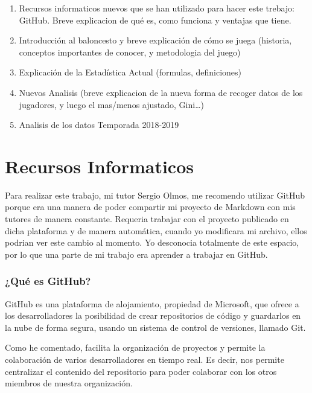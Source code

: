 \documentclass[
]{article}
\begin{document}
\begin{enumerate}
\def\labelenumi{\arabic{enumi}.}
\setcounter{enumi}{-1}
\item
  Recursos informaticos nuevos que se han utilizado para hacer este
  trebajo: GitHub. Breve explicacion de qué es, como funciona y ventajas
  que tiene.
\item
  Introducción al baloncesto y breve explicación de cómo se juega
  (historia, conceptos importantes de conocer, y metodologia del juego)
\item
  Explicación de la Estadística Actual (formulas, definiciones)
\item
  Nuevos Analisis (breve explicacion de la nueva forma de recoger datos
  de los jugadores, y luego el mas/menos ajustado, Gini\ldots)
\item
  Analisis de los datos Temporada 2018-2019
\end{enumerate}

\hypertarget{recursos-informaticos}{%
\section{Recursos Informaticos}\label{recursos-informaticos}}

Para realizar este trabajo, mi tutor Sergio Olmos, me recomendo utilizar
GitHub porque era una manera de poder compartir mi proyecto de Markdown
con mis tutores de manera constante. Requeria trabajar con el proyecto
publicado en dicha plataforma y de manera automática, cuando yo
modificara mi archivo, ellos podrian ver este cambio al momento. Yo
desconocia totalmente de este espacio, por lo que una parte de mi
trabajo era aprender a trabajar en GitHub.

\hypertarget{quuxe9-es-github}{%
\subsubsection{¿Qué es GitHub?}\label{quuxe9-es-github}}

GitHub es una plataforma de alojamiento, propiedad de Microsoft, que
ofrece a los desarrolladores la posibilidad de crear repositorios de
código y guardarlos en la nube de forma segura, usando un sistema de
control de versiones, llamado Git.

Como he comentado, facilita la organización de proyectos y permite la
colaboración de varios desarrolladores en tiempo real. Es decir, nos
permite centralizar el contenido del repositorio para poder colaborar
con los otros miembros de nuestra organización.
\end{document}
